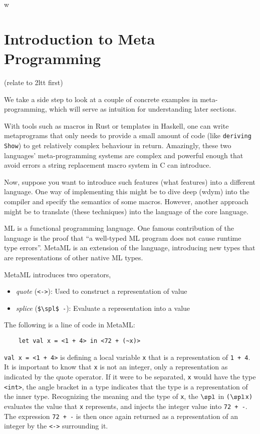 w\section{Introduction to Meta Programming}

(relate to 2ltt first)


We take a side step to look at a couple of concrete examples in meta-programming, which will serve as intuition for understanding later sections.

With tools such as macros in Rust or templates in Haskell, one can write metaprograms that only needs to provide a small amount of code (like \lstinline[mathescape]{deriving Show}) to get relatively complex behaviour in return. Amazingly, these two languages' meta-programming systems are complex and powerful enough that avoid errors a string replacement macro system in C can introduce.

Now, suppose you want to introduce such features (what features) into a different language. One way of implementing this might be to dive deep (wdym) into the compiler and specify the semantics of some macros. However, another approach might be to translate (these techniques) into the language of the core language. 

ML is a functional programming language. One famous contribution of the language is the proof that ``a well-typed ML program does not cause runtime type errors''. MetaML is an extension of the language, introducing new types that are representations of other native ML types. 

MetaML introduces two operators, 
\begin{itemize}
    \item \textit{quote} (\lstinline[mathescape]{<->}): Used to construct a representation of value
    \item \textit{splice} (\lstinline[mathescape]{$\spl$ -}): Evaluate a representation into a value
\end{itemize} 

The following is a line of code in MetaML:

\begin{lstlisting}
    let val x = <1 + 4> in <72 + (~x)>
\end{lstlisting}

\lstinline[mathescape]{val x = <1 + 4>} is defining a local variable \texttt{x} that is a representation of \lstinline[mathescape]{1 + 4}.  It is important to know that \texttt{x} is not an integer, only a representation as indicated by the quote operator. If it were to be separated, \texttt{x} would have the type \texttt{<int>}, the angle bracket in a type indicates that the type is a representation of the inner type. Recognizing the meaning and the type of \texttt{x}, the $\spl$ in \texttt{($\spl$x)} evaluates the value that \texttt{x} represents, and injects the integer value into \lstinline[mathescape]{72 + -}. The expression \lstinline[mathescape]{72 + -} is then once again returned as a representation of an integer by the \texttt{<->} surrounding it.  

